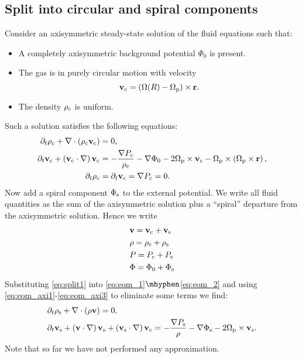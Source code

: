 \documentclass[useAMS,usenatbib]{mn2e}
\def\pa{\partial}
\begin{document}
\subsection{Split into circular and spiral components}
Consider an axisymmetric steady-state solution of the fluid equations such that: 
\begin{itemize}
\item A completely axisymmetric background potential $\Phi_0$ is present.
\item The gas is in purely circular motion with velocity 
\begin{equation}
\mathbf{v}_{\rm c} = \left( {\Omega}(R) - {\Omega}_{\rm p} \right) \times \mathbf{r}.
\end{equation}
\item The density $\rho_{\rm c}$ is uniform.
\end{itemize}
Such a solution satisfies the following equations:
\begin{align} 
	\pa_t \rho_{\rm c} + \nabla \cdot \left( \rho_{\rm c} \bfv_{\rm c} \right) & = 0, \label{eq:eom_axi1}\\
	\pa_t \bfv_{\rm c} + \left( \bfv_{\rm c} \cdot \nabla \right) \bfv_{\rm c} & = - \frac{\nabla P_{\rm c}}{\rho_{\rm c}} -\nabla \Phi_0 - 2 \bfOmegap \times \bfv_{\rm c} - \bfOmegap \times \left( \bfOmegap \times \bfr \right), \label{eq:eom_axi2}\\
	\pa_t \rho_{\rm c} & = \pa_t \bfv_{\rm c} = \nabla P_{\rm c} = 0. \label{eq:eom_axi3}
\end{align}
%
Now add a spiral component $\Phi_{\rm s}$ to the external potential. We write all fluid quantities as the sum of the axisymmetric solution plus a ``spiral'' departure from the axisymmetric solution. Hence we write
\begin{equation}
\begin{split} \label{eq:split1}
& \mathbf{v} = \mathbf{v}_{\rm c} + \mathbf{v}_{\rm s}\\
& \rho = \rho_{\rm c} + \rho_{\rm s}\\
& P = P_{\rm c} + P_{\rm s} \\
& \Phi = \Phi_0 + \Phi_{\rm s}
\end{split}
\end{equation}
Substituting \eqref{eq:split1} into \eqref{eq:eom_1}$\mhyphen$\eqref{eq:eom_2} and using \eqref{eq:eom_axi1}-\eqref{eq:eom_axi3} to eliminate some terms we find: 
\begin{align}
	& \pa_t \rho_{\rm s} + \nabla \cdot \left( \rho \bfv \right)  = 0 ,\\
	& \pa_t \bfv_{\rm s} + \left( \bfv \cdot \nabla \right) \bfv_{\rm s} + \left( \bfv_{\rm s} \cdot \nabla \right) \bfv_{\rm c}   = - \frac{\nabla P_{\rm s}}{\rho} -\nabla \Phi_{\rm s} - 2 \bfOmegap \times \bfv_{\rm s}. \label{eq:cont+euler}
\end{align}
%
Note that so far we have not performed any approximation.
\end{document}
